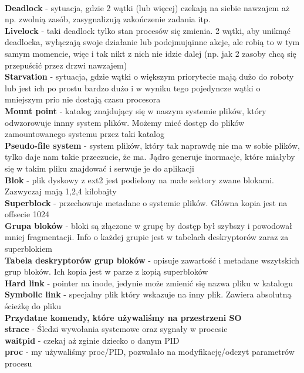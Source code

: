 \documentclass{article}
\begin{document}
\\ \textbf{Deadlock} - sytuacja, gdzie 2 wątki (lub więcej) czekają na siebie nawzajem aż np. zwolnią zasób, zasygnalizują zakończenie zadania itp.
\\ \textbf{Livelock} - taki deadlock tylko stan procesów się zmienia. 2 wątki, aby uniknąć deadlocka, wyłączają swoje działanie lub podejmująinne akcje, ale robią to w tym samym momencie, więc i tak nikt z nich nie idzie dalej (np. jak 2 zasoby chcą się przepuścić przez drzwi nawzajem)
\\ \textbf{Starvation} - sytuacja, gdzie wątki o większym priorytecie mają dużo do roboty lub jest ich po prostu bardzo dużo i w wyniku tego pojedyncze wątki o mniejszym prio nie dostają czasu procesora
\\ \textbf{Mount point} - katalog znajdujący się w naszym systemie plików, który odwzorowuje innny system plików. Możemy mieć dostęp do plików zamountowanego systemu przez taki katalog
\\ \textbf{Pseudo-file system} - system plików, który tak naprawdę nie ma w sobie plików, tylko daje nam takie przeczucie, że ma. Jądro generuje inormacje, które miałyby się w takim pliku znajdować i serwuje je do aplikacji
\\ \textbf{Blok} - plik dyskowy z ext2 jest podielony na małe sektory zwane blokami. Zazwyczaj mają 1,2,4 kilobajty
\\ \textbf{Superblock} - przechowuje metadane o systemie plików. Główna kopia jest na offsecie 1024
\\ \textbf{Grupa bloków} - bloki są złączone w grupę by dostęp był szybszy i powodował mniej fragmentacji. Info o każdej grupie jest w tabelach deskryptorów zaraz za superblokiem 
\\ \textbf{Tabela deskryptorów grup bloków} - opisuje zawartość i metadane wszytskich grup bloków. Ich kopia jest w parze z kopią superbloków
\\ \textbf{Hard link} - pointer na inode, jedynie może zmienić się nazwa pliku w katalogu
\\ \textbf{Symbolic link} - specjalny plik który wskazuje na inny plik. Zawiera absolutną ścieżkę do pliku
\\ \textbf{Przydatne komendy, które używaliśmy na przestrzeni SO}
\\ \textbf{strace} - Śledzi wywołania systemowe oraz sygnały w procesie
\\ \textbf{waitpid} - czekaj aż zginie dziecko o danym PID
\\ \textbf{proc} - my używaliśmy proc/PID, pozwalało na modyfikację/odczyt parametrów procesu
\end{document}
